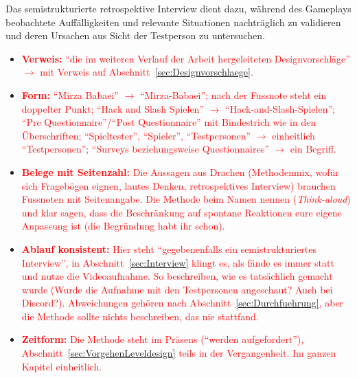 \documentclass[../Main.tex]{subfiles}
\begin{document}
Das semistrukturierte retrospektive Interview dient dazu, während des Gameplays beobachtete Auffälligkeiten und relevante Situationen nachträglich zu validieren und deren Ursachen aus Sicht der Testperson zu untersuchen.

\begin{itemize}[leftmargin=1.5cm]
    \item \textcolor{red}{\textbf{Verweis:} \enquote{die im weiteren Verlauf der Arbeit hergeleiteten Designvorschläge} $\rightarrow$ mit Verweis auf Abschnitt~\ref{sec:Designvorschlaege}.}
    \item \textcolor{red}{\textbf{Form:} \enquote{Mirza Babaei} $\rightarrow$ \enquote{Mirza-Babaei}; nach der Fussnote steht ein doppelter Punkt; \enquote{Hack and Slash Spielen} $\rightarrow$ \enquote{Hack-and-Slash-Spielen}; \enquote{Pre Questionnaire}/\enquote{Post Questionnaire} mit Bindestrich wie in den Überschriften; \enquote{Spieltester}, \enquote{Spieler}, \enquote{Testpersonen} $\rightarrow$ einheitlich \enquote{Testpersonen}; \enquote{Surveys beziehungsweise Questionnaires} $\rightarrow$ ein Begriff.}
    \item \textcolor{red}{\textbf{Belege mit Seitenzahl:} Die Aussagen aus Drachen (Methodenmix, wofür sich Fragebögen eignen, lautes Denken, retrospektives Interview) brauchen Fussnoten mit Seitenangabe. Die Methode beim Namen nennen (\emph{Think-aloud}) und klar sagen, dass die Beschränkung auf spontane Reaktionen eure eigene Anpassung ist (die Begründung habt ihr schon).}
    \item \textcolor{red}{\textbf{Ablauf konsistent:} Hier steht \enquote{gegebenenfalls ein semistrukturiertes Interview}, in Abschnitt~\ref{sec:Interview} klingt es, als fände es immer statt und nutze die Videoaufnahme. So beschreiben, wie es tatsächlich gemacht wurde (Wurde die Aufnahme mit den Testpersonen angeschaut? Auch bei Discord?). Abweichungen gehören nach Abschnitt~\ref{sec:Durchfuehrung}, aber die Methode sollte nichts beschreiben, das nie stattfand.}
    \item \textcolor{red}{\textbf{Zeitform:} Die Methode steht im Präsens (\enquote{werden aufgefordert}), Abschnitt~\ref{sec:VorgehenLeveldesign} teils in der Vergangenheit. Im ganzen Kapitel einheitlich.}
\end{itemize}
\end{document}
